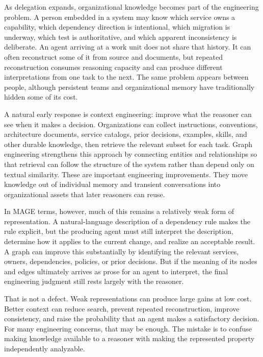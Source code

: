 

As delegation expands, organizational knowledge becomes part of the engineering problem. A person embedded in a system may know which service owns a capability, which dependency direction is intentional, which migration is underway, which test is authoritative, and which apparent inconsistency is deliberate. An agent arriving at a work unit does not share that history. It can often reconstruct some of it from source and documents, but repeated reconstruction consumes reasoning capacity and can produce different interpretations from one task to the next. The same problem appears between people, although persistent teams and organizational memory have traditionally hidden some of its cost.

A natural early response is context engineering: improve what the reasoner can see when it makes a decision. Organizations can collect instructions, conventions, architecture documents, service catalogs, prior decisions, examples, skills, and other durable knowledge, then retrieve the relevant subset for each task. Graph engineering strengthens this approach by connecting entities and relationships so that retrieval can follow the structure of the system rather than depend only on textual similarity. These are important engineering improvements. They move knowledge out of individual memory and transient conversations into organizational assets that later reasoners can reuse.

In MAGE terms, however, much of this remains a relatively weak form of representation. A natural-language description of a dependency rule makes the rule explicit, but the producing agent must still interpret the description, determine how it applies to the current change, and realize an acceptable result. A graph can improve this substantially by identifying the relevant services, owners, dependencies, policies, or prior decisions. But if the meaning of its nodes and edges ultimately arrives as prose for an agent to interpret, the final engineering judgment still rests largely with the reasoner.

That is not a defect. Weak representations can produce large gains at low cost. Better context can reduce search, prevent repeated reconstruction, improve consistency, and raise the probability that an agent makes a satisfactory decision. For many engineering concerns, that may be enough. The mistake is to confuse making knowledge available to a reasoner with making the represented property independently analyzable.

